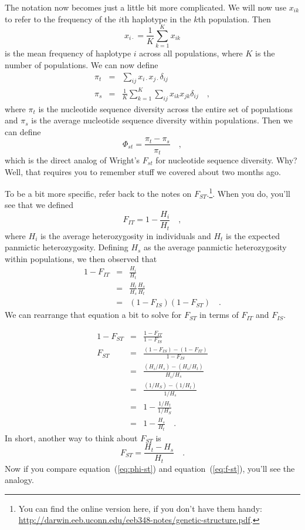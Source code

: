 \documentclass[12pt]{article}
\begin{document}
The notation now becomes just a little bit more complicated. We will
now use $x_{ik}$ to refer to the frequency of the $i$th haplotype in
the $k$th population. Then
\[
x_{i\cdot} = \frac{1}{K}\sum_{k=1}^K x_{ik}
\]
is the mean frequency of haplotype $i$ across all populations, where
$K$ is the number of populations. We can now define
\begin{eqnarray*}
\pi_t &=& \sum_{ij} x_{i\cdot}x_{j\cdot} \delta_{ij} \\
\pi_s &=& \frac{1}{K}\sum_{k=1}^K\sum_{ij} x_{ik}x_{jk}\delta_{ij} \quad ,
\end{eqnarray*}
where $\pi_t$ is the nucleotide sequence diversity across the entire
set of populations and $\pi_s$ is the average nucleotide sequence
diversity within populations. Then we can define
\begin{equation}
\Phi_{st} = \frac{\pi_t - \pi_s}{\pi_t} \quad ,
\label{eq:phi-st}
\end{equation}
which is the direct analog of Wright's $F_{st}$ for nucleotide
sequence diversity. Why? Well, that requires you to remember stuff we
covered about two months ago.

To be a bit more specific, refer back to the 
notes on $F_{ST}$.\footnote{You can find the online version here, if
  you don't have them handy: \url{http://darwin.eeb.uconn.edu/eeb348-notes/genetic-structure.pdf}.}.
When you do, you'll see that we defined
\[
F_{IT} = 1 - \frac{H_i}{H_t} \quad ,
\]
where $H_i$ is the average heterozygosity in individuals and $H_t$ is
the expected panmictic heterozygosity. Defining $H_s$ as the average
panmictic heterozygosity within populations, we then observed that
\begin{eqnarray*}
1 - F_{IT} &=& \frac{H_i}{H_t} \\
           &=& \frac{H_i}{H_s}\frac{H_s}{H_t} \\
           &=& (1 - F_{IS})(1 - F_{ST}) \quad .
\end{eqnarray*}
We can rearrange that equation a bit to solve for $F_{ST}$ in terms of
$F_{IT}$ and $F_{IS}$.

\begin{eqnarray*}
1-F_{ST} &=& \frac{1-F_{IT}}{1-F_{IS}} \\
F_{ST} &=&
\frac{\left(1-F_{IS}\right)-\left(1-F_{IT}\right)}{1-F_{IS}} \\
&=& \frac{\left(H_i/H_s\right) - \left(H_i/H_t\right)}{H_i/H_s} \\
&=& \frac{\left(1/H_S\right) - \left(1/H_t\right)}{1/H_s} \\
&=& 1 - \frac{1/H_t}{1/H_S} \\  
&=& 1 - \frac{H_s}{H_t} \quad .
\end{eqnarray*}
In short, another way to think about $F_{ST}$ is
\begin{equation}
F_{ST} = \frac{H_t - H_s}{H_t} \quad .
\label{eq:f-st}
\end{equation}
Now if you compare equation~(\ref{eq:phi-st}) and
equation~(\ref{eq:f-st}), you'll see the analogy.
\end{document}

